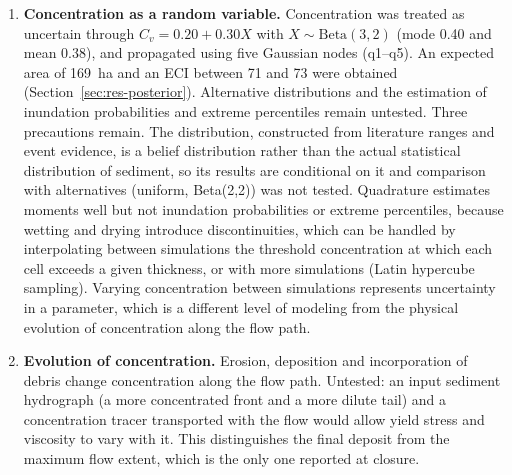 \begin{enumerate}
\item \textbf{Concentration as a random variable.} Concentration was treated as uncertain through $C_v=0.20+0.30X$ with $X\sim\mathrm{Beta}(3,2)$ (mode 0.40 and mean 0.38), and propagated using five Gaussian nodes (q1--q5). An expected area of \SI{169}{ha} and an ECI between 71 and 73 were obtained (Section~\ref{sec:res-posterior}). Alternative distributions and the estimation of inundation probabilities and extreme percentiles remain untested. Three precautions remain. The distribution, constructed from literature ranges and event evidence, is a belief distribution rather than the actual statistical distribution of sediment, so its results are conditional on it and comparison with alternatives (uniform, Beta(2,2)) was not tested. Quadrature estimates moments well but not inundation probabilities or extreme percentiles, because wetting and drying introduce discontinuities, which can be handled by interpolating between simulations the threshold concentration at which each cell exceeds a given thickness, or with more simulations (Latin hypercube sampling). Varying concentration between simulations represents uncertainty in a parameter, which is a different level of modeling from the physical evolution of concentration along the flow path.
\item \textbf{Evolution of concentration.} Erosion, deposition and incorporation of debris change concentration along the flow path. Untested: an input sediment hydrograph (a more concentrated front and a more dilute tail) and a concentration tracer transported with the flow would allow yield stress and viscosity to vary with it. This distinguishes the final deposit from the maximum flow extent, which is the only one reported at closure.
\end{enumerate}
